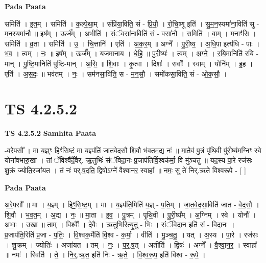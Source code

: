 \documentclass[17pt]{extarticle}
\begin{document}
\textbf{Pada Paata} \newline

समिति॑ । इ॒त॒म् । समिति॑ । क॒ल्पे॒था॒म् । संप्रि॑या॒विति॒ सं - प्रि॒यौ॒ । रो॒चि॒ष्णू इति॑ । सु॒म॒न॒स्यमा॑ना॒विति॑ सु - म॒न॒स्यमा॑नौ ॥ इष᳚म् । ऊर्ज᳚म् । अ॒भीति॑ । सं॒ॅवसा॑ना॒विति॑ सं - वसा॑नौ । समिति॑ । वा॒म् । मनाꣳ॑सि । समिति॑ । व्र॒ता । समिति॑ । उ॒ । चि॒त्तानि॑ । एति॑ । अ॒क॒र॒म् ॥ अग्ने᳚ । पु॒री॒ष्य॒ । अ॒धि॒पा इत्य॑धि - पाः । भ॒व॒ । त्वम् । नः॒ ॥ इष᳚म् । ऊर्ज᳚म् । यज॑मानाय । धे॒हि॒ ॥ पु॒री॒ष्यः॑ । त्वम् । अ॒ग्ने॒ । र॒यि॒मानिति॑ रयि - मान् । पु॒ष्टि॒मानिति॑ पुष्टि-मान् । अ॒सि॒ ॥ शि॒वाः । कृ॒त्वा । दिशः॑ । सर्वाः᳚ । स्वाम् । योनि᳚म् । इ॒ह । एति॑ । अ॒स॒दः॒ ॥ भव॑तम् । नः॒ । सम॑नसा॒विति॒ स - म॒न॒सौ॒ । समो॑कसा॒विति॒ सं - ओ॒क॒सौ॒ ।  \newline





\section{ TS 4.2.5.2 }

\textbf{TS 4.2.5.2 } \newline
\textbf{Samhita Paata} \newline

-वरे॒पसौ᳚ । मा य॒ज्ञ्ꣳ हिꣳ॑सिष्टं॒ मा य॒ज्ञ्प॑तिं जातवेदसौ शि॒वौ भ॑वतम॒द्य नः॑ ॥ मा॒तेव॑ पु॒त्रं पृ॑थि॒वी पु॑री॒ष्य॑म॒ग्निꣳ स्वे योना॑वभारु॒खा । तां ॅविश्वै᳚र्दे॒वैर्. ऋ॒तुभिः॑ संॅविदा॒नः प्र॒जाप॑तिर्वि॒श्वक॑र्मा॒ वि मु॑ञ्चतु ॥ यद॒स्य पा॒रे रज॑सः शु॒क्रं ज्योति॒रजा॑यत । तं नः॑ पर्.ष॒दति॒ द्विषोऽग्ने॑ वैश्वानर॒ स्वाहा᳚ ॥ नमः॒ सु ते॑ निर्.ऋते विश्वरूपे - [  ] \newline

\textbf{Pada Paata} \newline

अ॒रे॒पसौ᳚ ॥ मा । य॒ज्ञ्म् । हिꣳ॒॒सि॒ष्ट॒म् । मा । य॒ज्ञ्प॑ति॒मिति॑ य॒ज्ञ् - प॒ति॒म् । जा॒त॒वे॒द॒सा॒विति॑ जात - वे॒द॒सौ॒ । शि॒वौ । भ॒व॒त॒म् । अ॒द्य । नः॒ ॥ मा॒ता । इ॒व॒ । पु॒त्रम् । पृ॒थि॒वी । पु॒री॒ष्य᳚म् । अ॒ग्निम् । स्वे । योनौ᳚ । अ॒भाः॒ । उ॒खा ॥ ताम् । विश्वैः᳚ । दे॒वैः । ऋ॒तुभि॒रित्यृ॒तु - भिः॒ । सं॒ॅवि॒दा॒न इति॑ सं - वि॒दा॒नः । प्र॒जाप॑ति॒रिति॑ प्र॒जा - प॒तिः॒ । वि॒श्वक॒र्मेति॑ वि॒श्व - क॒र्मा॒ । वीति॑ । मु॒ञ्च॒तु॒ ॥ यत् । अ॒स्य । पा॒रे । रज॑सः । शु॒क्रम् । ज्योतिः॑ । अजा॑यत ॥ तम् । नः॒ । प॒र्॒.ष॒त् । अतीति॑ । द्विषः॑ । अग्ने᳚ । वै॒श्वा॒न॒र॒ । स्वाहा᳚ ॥ नमः॑ । स्विति॑ । ते॒ । नि॒र्॒.ऋ॒त॒ इति॑ निः - ऋ॒ते॒ । वि॒श्व॒रू॒प॒ इति॑ विश्व - रू॒पे॒ ।  \newline
\end{document}

